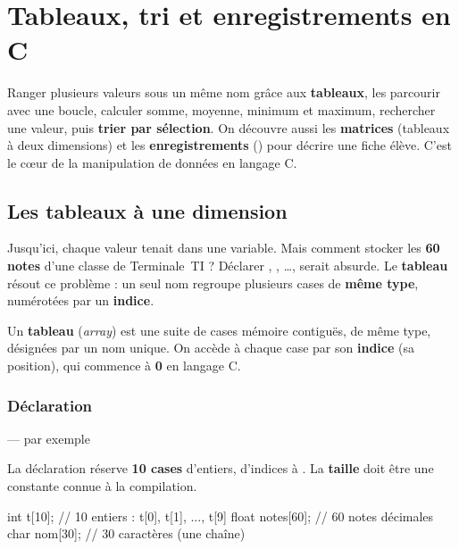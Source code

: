 \chapter{Tableaux, tri et enregistrements en C}

\begin{synthese}[Au programme]
Ranger plusieurs valeurs sous un même nom grâce aux \textbf{tableaux}, les
parcourir avec une boucle, calculer somme, moyenne, minimum et maximum, rechercher
une valeur, puis \textbf{trier par sélection}. On découvre aussi les
\textbf{matrices} (tableaux à deux dimensions) et les \textbf{enregistrements}
() pour décrire une fiche élève. C'est le cœur de la manipulation de
données en langage C.
\end{synthese}

\section{Les tableaux à une dimension}

Jusqu'ici, chaque valeur tenait dans une variable. Mais comment stocker les
\textbf{60 notes} d'une classe de Terminale~TI ? Déclarer , ,
\dots,  serait absurde. Le \textbf{tableau} résout ce problème : un seul
nom regroupe plusieurs cases de \textbf{même type}, numérotées par un \textbf{indice}.

\begin{definition}
Un \textbf{tableau} (\emph{array}) est une suite de cases mémoire contiguës, de
même type, désignées par un nom unique. On accède à chaque case par son
\textbf{indice} (sa position), qui commence à \textbf{0} en langage C.
\end{definition}

\subsection{Déclaration}

\begin{syntaxe}
\quad — par exemple 
\end{syntaxe}

La déclaration  réserve \textbf{10 cases} d'entiers, d'indices
 à . La \textbf{taille} doit être une constante connue à la
compilation.

\begin{codec}
int t[10];          // 10 entiers : t[0], t[1], ..., t[9]
float notes[60];    // 60 notes décimales
char nom[30];       // 30 caractères (une chaîne)
\end{codec}

